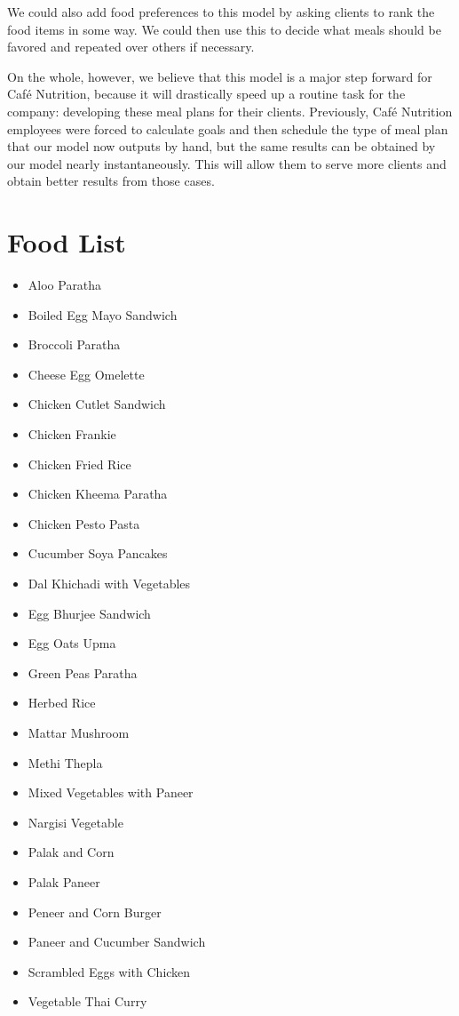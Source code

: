 \documentclass[twoside]{article}
\newcommand{\cn}{Caf\'e Nutrition\xspace}
\begin{document}
We could also add food preferences to this model by asking clients to rank the food items in some way. We could then use this to decide what meals should be favored and repeated over others if necessary.

On the whole, however, we believe that this model is a major step forward for \cn, because it will drastically speed up a routine task for the company: developing these meal plans for their clients. Previously, \cn employees were forced to calculate goals and then schedule the type of meal plan that our model now outputs by hand, but the same results can be obtained by our model nearly instantaneously. This will allow them to serve more clients and obtain better results from those cases.
\newpage
\appendix
\section{Food List}
\label{sec:food-list}
\begin{itemize}
    \item Aloo Paratha
    \item Boiled Egg Mayo Sandwich
    \item Broccoli Paratha
    \item Cheese Egg Omelette
    \item Chicken Cutlet Sandwich
    \item Chicken Frankie
    \item Chicken Fried Rice
    \item Chicken Kheema Paratha
    \item Chicken Pesto Pasta
    \item Cucumber Soya Pancakes
    \item Dal Khichadi with Vegetables
    \item Egg Bhurjee Sandwich
    \item Egg Oats Upma
    \item Green Peas Paratha
    \item Herbed Rice
    \item Mattar Mushroom
    \item Methi Thepla
    \item Mixed Vegetables with Paneer
    \item Nargisi Vegetable
    \item Palak and Corn
    \item Palak Paneer
    \item Peneer and Corn Burger
    \item Paneer and Cucumber Sandwich
    \item Scrambled Eggs with Chicken
    \item Vegetable Thai Curry
\end{itemize}
\end{document}
